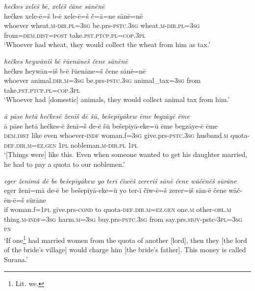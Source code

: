 \ea \label{BP.15}
\textit{hečkes xelēš bē, xelēš čāne sānēnē} \\ 
\gll hečkes xele-ē=š b-ē xele-ē=š č=ā=ne sānē=nē \\ 
 whoever wheat\textsc{.m}\textsc{-dir}\textsc{.pl}\textsc{=3sg} be.prs\textsc{-pstc}\textsc{.3sg} wheat\textsc{.m}\textsc{-dir}\textsc{.pl}\textsc{=3sg} from=\textsc{dem.dist}\textsc{=\textsc{post}} take\textsc{.pst}\textsc{.ptcp}\textsc{.pl}\textsc{=cop}\textsc{.3pl} \\ 
\glt `Whoever had wheat, they would collect the wheat from him as tax.'
\z 
 
\ea \label{BP.16}
\textit{hečkes ħeywāniš bē řūenāneš čene sānēnē} \\ 
\gll hečkes ħeywān=iš b-ē řūenāne=š čene sānē=nē \\ 
 whoever animal\textsc{.dir}\textsc{.m}\textsc{=3sg} be.prs\textsc{-pstc}\textsc{.3sg} animal\_tax\textsc{=3sg} from take\textsc{.pst}\textsc{.ptcp}\textsc{.pl}\textsc{=cop}\textsc{.3pl} \\ 
\glt `Whoever had [domestic] animals, they would collect animal tax from him.'
\z 
 
\ea \label{BP.17}
\textit{ā pāse hetā hečkesē ženīš dē šū, bešepīyākew ēme begzāyē ēme} \\ 
\gll ā pāse hetā hečkes-ē ženī=š de-ē šū bešepīyā-eke=ū ēme begzāye-ē ēme \\ 
 \textsc{dem.dist} like even whoever\textsc{-indf} woman.f\textsc{=3sg} give.prs\textsc{-pstc}\textsc{.3sg} husband\textsc{.m} quota\textsc{-def}\textsc{.dir}\textsc{.m}\textsc{=ez.gen} \textsc{1pl} nobleman\textsc{.m}\textsc{-dir}\textsc{.pl} \textsc{1pl} \\ 
\glt `[Things were] like this. Even when someone wanted to get his daughter married, he had to pay a quota  to our noblemen.'
\z 
 
\ea \label{BP.18}
\textit{eger ženīmā dē be bešepīyākew yo terī čīwēš zereriš sānē čene wāčēnēš sūrāne} \\ 
\gll eger ženī=mā de-ē be bešepīyā-eke=ū yo ter-ī čīw-ē=š zerer=iš sān-ē čene wāč-ēn-ē=š sūrāne \\ 
 if woman.f\textsc{=\textsc{1pl}} give.prs\textsc{-cond} to quota\textsc{-def}\textsc{.dir}\textsc{.m}\textsc{=ez.gen} one\textsc{.m} other\textsc{-obl}\textsc{.m} thing\textsc{.m}\textsc{-indf}\textsc{=3sg} harm\textsc{.m}\textsc{=3sg} buy.prs\textsc{-pstc}\textsc{.3sg} from say.prs.\textsc{sbjv-}pstc\textsc{-3pl}\textsc{=3sg} \textsc{pn} \\ 
\glt `If one\footnote{Lit. we.} had married women from the quota of another [lord], then they [the lord of the bride's village] would charge him [the bride’s father]. This money is called Surana.'
\z 
 
